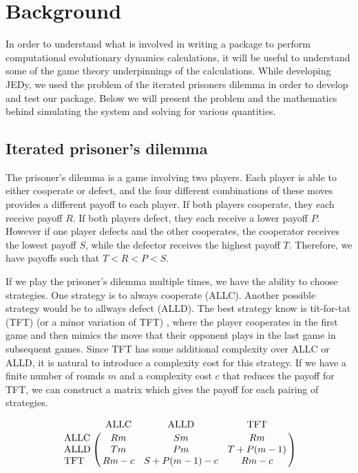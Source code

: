 \section{Background}

In order to understand what is involved in writing a package to perform computational evolutionary dynamics calculations, it will be useful to understand some of the game theory underpinnings of the calculations.
While developing JEDy, we used the problem of the iterated prisoners dilemma in order to develop and test our package.
Below we will present the problem and the mathematics behind simulating the system and solving for various quantities.

\subsection{Iterated prisoner's dilemma}

The prisoner's dilemma is a game involving two players.
Each player is able to either cooperate or defect, and the four different combinations of these moves provides a different payoff to each player.
If both players cooperate, they each receive payoff $R$.
If both players defect, they each receive a lower payoff $P$.
However if one player defects and the other cooperates, the cooperator receives the lowest payoff $S$, while the defector receives the highest payoff $T$.
Therefore, we have payoffs such that $T < R < P < S$.

If we play the prisoner's dilemma multiple times, we have the ability to choose strategies.
One strategy is to always cooperate (ALLC).
Another possible strategy would be to allways defect (ALLD).
The best strategy know is tit-for-tat (TFT) (or a minor variation of TFT) \cite{nowaksigmund93}, where the player cooperates in the first game and then mimics the move that their opponent plays in the last game in subsequent games.
Since TFT has some additional complexity over ALLC or ALLD, it is natural to introduce a complexity cost for this strategy.
If we have a finite number of rounds $m$ and a complexity cost $c$ that reduces the payoff for TFT, we can construct a matrix which gives the payoff for each pairing of strategies.

\begin{equation}
    \bordermatrix{
        ~ & \text{ALLC} & \text{ALLD} & \text{TFT} \cr
        \text{ALLC} & Rm & Sm & Rm \cr
        \text{ALLD} & Tm & Pm & T + P(m - 1) \cr
        \text{TFT} & Rm - c & S + P(m-1) - c & Rm - c \cr
    }
\end{equation}

